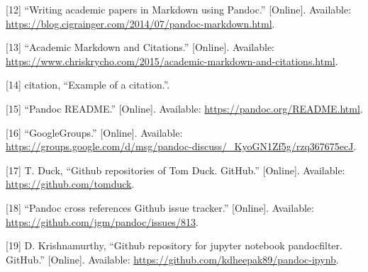 \documentclass[journal,10pt,final]{IEEEtran}
\begin{document}
\hypertarget{ref-ux5fwriting-1}{}
{[}12{]} ``Writing academic papers in Markdown using Pandoc.''
{[}Online{]}. Available:
\url{https://blog.cigrainger.com/2014/07/pandoc-markdown.html}.

\hypertarget{ref-ux5facademic}{}
{[}13{]} ``Academic Markdown and Citations.'' {[}Online{]}. Available:
\url{https://www.chriskrycho.com/2015/academic-markdown-and-citations.html}.

\hypertarget{ref-citationux5fexample}{}
{[}14{]} citation, ``Example of a citation.''.

\hypertarget{ref-ux5fpandoc}{}
{[}15{]} ``Pandoc README.'' {[}Online{]}. Available:
\url{https://pandoc.org/README.html}.

\hypertarget{ref-ux5fgooglegroups}{}
{[}16{]} ``GoogleGroups.'' {[}Online{]}. Available:
\url{https://groups.google.com/d/msg/pandoc-discuss/_KyoGN1Zf5g/rzq367675ecJ}.

\hypertarget{ref-duckux5fgithub}{}
{[}17{]} T. Duck, ``Github repositories of Tom Duck. GitHub.''
{[}Online{]}. Available: \url{https://github.com/tomduck}.

\hypertarget{ref-ux5fpandoc-1}{}
{[}18{]} ``Pandoc cross references Github issue tracker.'' {[}Online{]}.
Available: \url{https://github.com/jgm/pandoc/issues/813}.

\hypertarget{ref-krishnamurthyux5fgithub-1}{}
{[}19{]} D. Krishnamurthy, ``Github repository for jupyter notebook
pandocfilter. GitHub.'' {[}Online{]}. Available:
\url{https://github.com/kdheepak89/pandoc-ipynb}.
\end{document}
